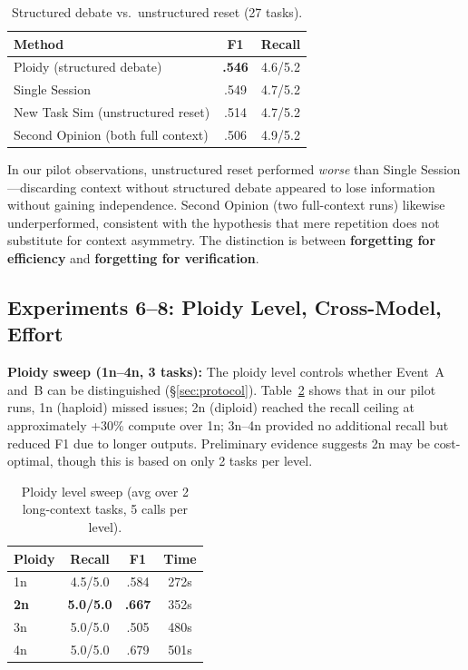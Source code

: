 \documentclass{article}
\begin{document}
\begin{table}[t]
\centering
\caption{Structured debate vs.\ unstructured reset (27 tasks).}
\label{tab:new-task}
\footnotesize
\begin{tabular}{@{}lcc@{}}
\toprule
\textbf{Method} & \textbf{F1} & \textbf{Recall} \\
\midrule
Ploidy (structured debate) & \textbf{.546} & 4.6/5.2 \\
Single Session & .549 & 4.7/5.2 \\
New Task Sim (unstructured reset) & .514 & 4.7/5.2 \\
Second Opinion (both full context) & .506 & 4.9/5.2 \\
\bottomrule
\end{tabular}
\end{table}

In our pilot observations, unstructured reset performed \emph{worse} than Single Session---discarding context without structured debate appeared to lose information without gaining independence. Second Opinion (two full-context runs) likewise underperformed, consistent with the hypothesis that mere repetition does not substitute for context asymmetry. The distinction is between \textbf{forgetting for efficiency} and \textbf{forgetting for verification}.

\subsection{Experiments 6--8: Ploidy Level, Cross-Model, Effort}

\textbf{Ploidy sweep (1n--4n, 3 tasks):} The ploidy level controls whether Event~A and~B can be distinguished (\S\ref{sec:protocol}). Table~\ref{tab:ploidy-sweep} shows that in our pilot runs, 1n (haploid) missed issues; 2n (diploid) reached the recall ceiling at approximately +30\% compute over 1n; 3n--4n provided no additional recall but reduced F1 due to longer outputs. Preliminary evidence suggests 2n may be cost-optimal, though this is based on only 2 tasks per level.

\begin{table}[t]
\centering
\caption{Ploidy level sweep (avg over 2 long-context tasks, 5 calls per level).}
\label{tab:ploidy-sweep}
\footnotesize
\begin{tabular}{@{}lccc@{}}
\toprule
\textbf{Ploidy} & \textbf{Recall} & \textbf{F1} & \textbf{Time} \\
\midrule
1n & 4.5/5.0 & .584 & 272s \\
\textbf{2n} & \textbf{5.0/5.0} & \textbf{.667} & 352s \\
3n & 5.0/5.0 & .505 & 480s \\
4n & 5.0/5.0 & .679 & 501s \\
\bottomrule
\end{tabular}
\end{table}
\end{document}
